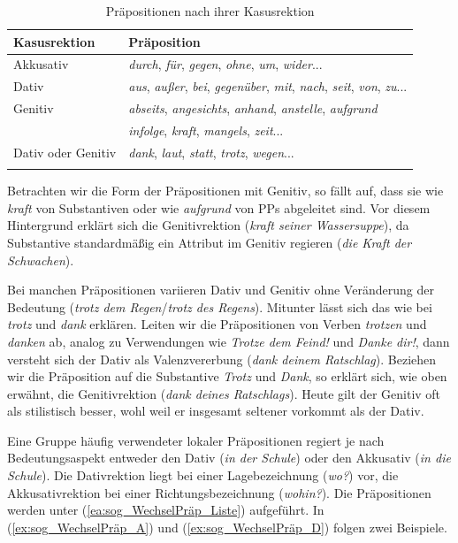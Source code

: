 \begin{table}
  \centering
  \begin{tabular}{l l}
    \lsptoprule
    Kasusrektion & Präposition \\
    \hline
    Akkusativ & \textit{durch}, \textit{für}, \textit{gegen}, \textit{ohne},  \textit{um}, \textit{wider}...\\
    
    Dativ & \textit{aus}, \textit{außer}, \textit{bei}, \textit{gegenüber}, \textit{mit}, \textit{nach}, \textit{seit}, \textit{von}, \textit{zu}... \\
    
    Genitiv & \textit{abseits}, \textit{angesichts}, \textit{anhand}, \textit{anstelle}, \textit{aufgrund} \\
    & \textit{infolge}, \textit{kraft}, \textit{mangels}, \textit{zeit}... \\
    
    Dativ oder Genitiv & \textit{dank}, \textit{laut}, \textit{statt}, \textit{trotz}, \textit{wegen}...\\
    \lspbottomrule 
  \end{tabular}
  \caption{Präpositionen nach ihrer Kasusrektion}
  \label{tab:Präp_Kasusrektion}
\end{table}

Betrachten wir die Form der Präpositionen mit Genitiv, so fällt auf, dass sie wie \textit{kraft} von Substantiven oder wie \textit{aufgrund} von PPs abgeleitet sind. Vor diesem Hintergrund erklärt sich die Genitivrektion (\textit{kraft seiner Wassersuppe}), da Substantive standardmäßig ein Attribut im Genitiv regieren (\textit{die Kraft der Schwachen}). 

Bei manchen Präpositionen variieren Dativ und Genitiv ohne Veränderung der Bedeutung (\textit{trotz dem Regen}/\textit{trotz des Regens}). Mitunter lässt sich das wie bei \textit{trotz} und \textit{dank} erklären. Leiten wir die Präpositionen von Verben \textit{trotzen} und \textit{danken} ab, analog zu Verwendungen wie \textit{Trotze dem Feind!} und \textit{Danke dir!}, dann versteht sich der Dativ als Valenzvererbung (\textit{dank deinem Ratschlag}). Beziehen wir die Präposition auf die Substantive \textit{Trotz} und \textit{Dank}, so erklärt sich, wie oben erwähnt, die Genitivrektion (\textit{dank deines Ratschlags}). Heute gilt der Genitiv oft als stilistisch besser, wohl weil er insgesamt seltener vorkommt als der Dativ.


Eine Gruppe häufig verwendeter lokaler Präpositionen regiert je nach Bedeutungsaspekt entweder den Dativ (\textit{in der Schule}) oder den Akkusativ (\textit{in die Schule}). Die Dativrektion liegt bei einer Lagebezeichnung (\textit{wo?}) vor, die Akkusativrektion bei einer Richtungsbezeichnung (\textit{wohin?}). Die Präpositionen werden unter (\ref{ea:sog_WechselPräp_Liste}) aufgeführt. In (\ref{ex:sog_WechselPräp_A}) und (\ref{ex:sog_WechselPräp_D}) folgen zwei Beispiele.

